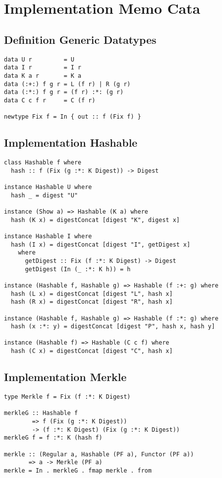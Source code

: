 \appendix
\chapter{Implementation Memo Cata}

\section{Definition Generic Datatypes}
\label{app-def-generic-datatypes}
\begin{verbatim}
data U r         = U
data I r         = I r                  
data K a r       = K a                  
data (:+:) f g r = L (f r) | R (g r)
data (:*:) f g r = (f r) :*: (g r) 
data C c f r     = C (f r)

newtype Fix f = In { out :: f (Fix f) }
\end{verbatim}

\section{Implementation Hashable}
\label{app-impl-hashable}
\begin{verbatim}
class Hashable f where
  hash :: f (Fix (g :*: K Digest)) -> Digest

instance Hashable U where
  hash _ = digest "U"

instance (Show a) => Hashable (K a) where
  hash (K x) = digestConcat [digest "K", digest x]

instance Hashable I where
  hash (I x) = digestConcat [digest "I", getDigest x]
    where
      getDigest :: Fix (f :*: K Digest) -> Digest
      getDigest (In (_ :*: K h)) = h

instance (Hashable f, Hashable g) => Hashable (f :+: g) where
  hash (L x) = digestConcat [digest "L", hash x]
  hash (R x) = digestConcat [digest "R", hash x]

instance (Hashable f, Hashable g) => Hashable (f :*: g) where
  hash (x :*: y) = digestConcat [digest "P", hash x, hash y]

instance (Hashable f) => Hashable (C c f) where
  hash (C x) = digestConcat [digest "C", hash x]
\end{verbatim}

\section{Implementation Merkle}
\label{app-impl-merkle}
\begin{verbatim}
type Merkle f = Fix (f :*: K Digest)

merkleG :: Hashable f 
        => f (Fix (g :*: K Digest)) 
        -> (f :*: K Digest) (Fix (g :*: K Digest))
merkleG f = f :*: K (hash f)

merkle :: (Regular a, Hashable (PF a), Functor (PF a)) 
       => a -> Merkle (PF a)
merkle = In . merkleG . fmap merkle . from
\end{verbatim}


